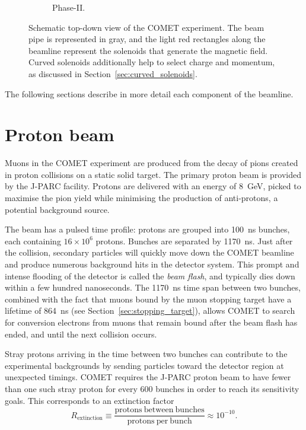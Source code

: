 \begin{figure}
\begin{subfigure}[b]{0.49\textwidth}
        \caption{Phase-II.}
    \end{subfigure}
    \caption{ Schematic top-down view of the COMET experiment. The beam pipe is
    represented in gray, and the light red rectangles along the beamline
    represent the solenoids that generate the magnetic field. Curved solenoids
    additionally help to select charge and momentum, as discussed in
    Section~\ref{sec:curved_solenoids}.}
    \label{fig:comet_schematic}
\end{figure}

The following sections describe in more detail each component of the beamline.


\section{Proton beam}\label{sec:COMET_beam}
Muons in the COMET experiment are produced from the decay of pions created in
proton collisions on a static solid target. The primary proton beam is provided
by the J-PARC facility. Protons are delivered with an energy of \SI{8}{\GeV},
picked to maximise the pion yield while minimising the production of
anti-protons, a potential background source.

The beam has a pulsed time profile: protons are grouped into \SI{100}{\ns}
bunches, each containing $16\times 10^6$ protons. Bunches are separated by
\SI{1170}{\ns}. Just after the collision, secondary particles will quickly move
down the COMET beamline and produce numerous background hits in the detector
system. This prompt and intense flooding of the detector is called the
\emph{beam flash}, and typically dies down within a few hundred nanoseconds. The
\SI{1170}{\ns} time span between two bunches, combined with the fact that muons
bound by the muon stopping target have a lifetime of \SI{864}{\ns} (see
Section~\ref{sec:stopping_target}), allows COMET to search for conversion
electrons from muons that remain bound after the beam flash has ended, and until
the next collision occurs.



Stray protons arriving in the time between two bunches can contribute to the
experimental backgrounds by sending particles toward the detector region at
unexpected timings. COMET requires the J-PARC proton beam to have fewer than one
such stray proton for every 600 bunches in order to reach its sensitivity goals.
This corresponds to an extinction factor
$$
R_\mathrm{extinction} \equiv \frac{\mathrm{protons\ between\
bunches}}{\mathrm{protons\ per\ bunch}} \approx 10^{-10}.
$$

